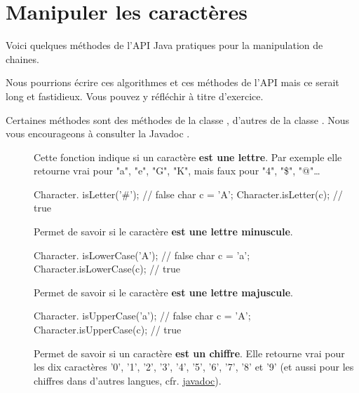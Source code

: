 \section{Manipuler les caractères}

	Voici quelques méthodes de l'API Java  pratiques 
	pour la manipulation de chaines. 

	Nous pourrions écrire ces algorithmes et ces méthodes de l'API mais ce serait
	long et fastidieux. Vous pouvez y réfléchir à titre d'exercice. 

	Certaines méthodes sont des méthodes de la classe , d'autres de
	la classe . Nous vous encourageons à consulter la Javadoc
	\cite{javadoc}. 
	
	
	\begin{description}
	
		\item[]
			Cette fonction indique si un caractère \textbf{est une lettre}. 
		Par exemple elle retourne vrai pour "a", "e", "G", "K", 
		mais faux pour "4", "\$", "@"\dots %


		\begin{java}
Character. isLetter('#');  // false
char c = 'A';
Character.isLetter(c);   // true			
		\end{java}
	
	
	\item[]	
		Permet de savoir si le caractère \textbf{est une lettre minuscule}.


		\begin{java}
Character. isLowerCase('A');  // false
char c = 'a';
Character.isLowerCase(c);   // true			
		\end{java}

	\item[]	
		Permet de savoir si le caractère \textbf{est une lettre majuscule}.
		

		\begin{java}
Character. isUpperCase('a');  // false
char c = 'A';
Character.isUpperCase(c);   // true			
		\end{java}
	

	\item[]	
		Permet de savoir si un caractère \textbf{est un chiffre}. 
		Elle retourne vrai pour les dix caractères 
		'0', '1', '2', '3', '4', '5', '6', '7', '8' et '9'
		(et aussi pour les chiffres dans d'autres langues, cfr. 
		\href{https://docs.oracle.com/javase/9/docs/api/java/lang/Character.html\#isDigit-char-}{javadoc}).


\end{description}
